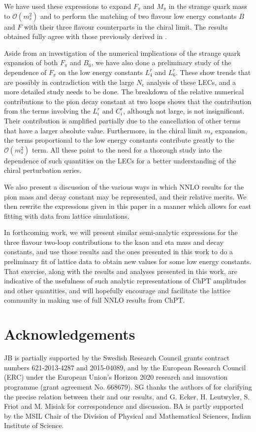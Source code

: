 \documentclass[12pt,a4paper]{article}
\begin{document}
We have used these expressions to expand $F_{\pi}$ and $M_{\pi}$ in the strange quark mass to $\mathcal{O}(m_s^2)$ and to perform the matching of two flavour low energy constants $B$ and $F$ with their three flavour counterparts in the chiral limit. The results obtained fully agree with those previously derived in \cite{Gasser:2007sg,Kaiser:2006uv,Schmid:thesis}. 

Aside from an investigation of the numerical implications of the strange quark expansion of both $F_{\pi}$ and $B_0$, we have also done a preliminary study of the dependence of $F_{\pi}$ on the low energy constants $L_4^r$ and $L_6^r$. These show trends that are possibly in contradiction with the large $N_c$ analysis of these LECs, and a more detailed study needs to be done. The breakdown of the relative numerical contributions to the pion decay constant at two loops shows that the contribution from the terms involving the $L^r_i$ and $C^r_i$, although not large, is not insignificant. Their contribution is amplified partially due
to the cancellation of other terms that have a larger absolute value. Furthermore, in the chiral limit $m_s$ expansion, the terms proportional to the low energy constants contribute greatly to the $\mathcal{O}(m_s^2)$ term. All these point to the need for a thorough study into the dependence of such quantities on the LECs for a better understanding of the chiral perturbation series.

We also present a discussion of the various ways in which NNLO results for the pion mass and decay constant may be represented, and their relative merits. We then rewrite the expressions given in this paper in a manner which allows for east fitting with data from lattice simulations.

In forthcoming work, we will present similar semi-analytic expressions for the three flavour two-loop contributions to the kaon and eta mass and decay constants, and use those results and the ones presented in this work to do a preliminary fit of lattice data to obtain new values for some low energy constants. That exercise, along with the results and analyses presented in this work, are indicative of the usefulness of such analytic representations of ChPT amplitudes and other quantities, and will hopefully encourage and facilitate the lattice community in making use of full NNLO results from ChPT.


\section*{Acknowledgements}
JB is partially supported by the Swedish Research Council grants contract numbers 621-2013-4287 and 2015-04089, and by the European Research Council (ERC) under the European Union's Horizon 2020 research and innovation programme (grant agreement No. 668679). SG thanks the authors of \cite{Gasser:2007sg, Gasser:2009hr, Gasser:2010zz} for clarifying the precise relation between their and our results, and G. Ecker, H. Leutwyler, S. Friot and M. Misiak for correspondence and discussion. BA is partly supported by the MSIL Chair of the Division of Physical and Mathematical Sciences, Indian Institute of Science.
\end{document}
